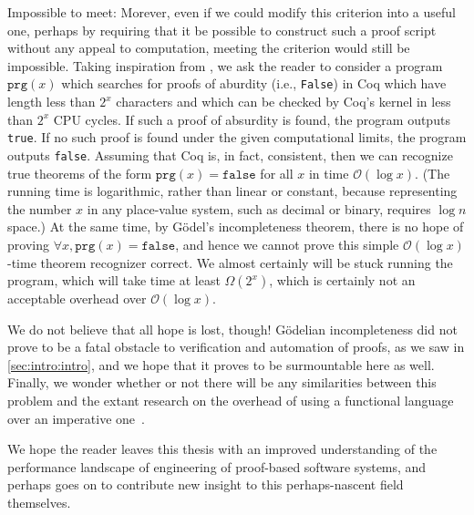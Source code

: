 Impossible to meet:
Morever, even if we could modify this criterion into a useful one, perhaps by requiring that it be possible to construct such a proof script without any appeal to computation, meeting the criterion would still be impossible.
Taking inspiration from \textcite[pp.~24--25]{Logical2016Garrabrant}, we ask the reader to consider a program $\texttt{prg}(x)$ which searches for proofs of aburdity (i.e., \texttt{False}) in Coq which have length less than $2^x$ characters and which can be checked by Coq's kernel in less than $2^x$ CPU cycles.
If such a proof of absurdity is found, the program outputs \texttt{true}.
If no such proof is found under the given computational limits, the program outputs \texttt{false}.
Assuming that Coq is, in fact, consistent, then we can recognize true theorems of the form $\texttt{prg}(x) = \texttt{false}$ for all $x$ in time $\mathcal O(\log x)$.
(The running time is logarithmic, rather than linear or constant, because representing the number $x$ in any place-value system, such as decimal or binary, requires $\log n$ space.)
At the same time, by G\"odel's incompleteness theorem, there is no hope of proving $\forall x, \texttt{prg}(x) = \texttt{false}$, and hence we cannot prove this simple $\mathcal O(\log x)$-time theorem recognizer correct.
We almost certainly will be stuck running the program, which will take time at least $\Omega(2^x)$, which is certainly not an acceptable overhead over $\mathcal O(\log x)$.

We do not believe that all hope is lost, though!
G\"odelian incompleteness did not prove to be a fatal obstacle to verification and automation of proofs, as we saw in \autoref{sec:intro:intro}, and we hope that it proves to be surmountable here as well.
Finally, we wonder whether or not there will be any similarities between this problem and the extant research on the overhead of using a functional language over an imperative one~\cite{Efficiency2010Campbell,Ben-AmramG92,Ben-amram96noteson,More1997Bird,okasaki1996purely,okasaki1998purely,Pure1997Pippenger}.

We hope the reader leaves this thesis with an improved understanding of the performance landscape of engineering of proof-based software systems, and perhaps goes on to contribute new insight to this perhaps-nascent field themselves.

